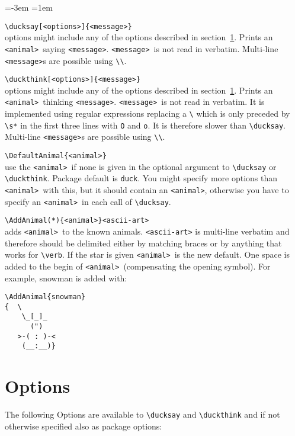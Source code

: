 \documentclass[]{article}
\newcommand*{\anml}{\texttt{<animal>}}
\newcommand*{\msg}{\texttt{<message>}}
\newenvironment{codedescription}{%
  \parindent=-3em%
  \parskip=1em%
  \par%
}{}
\begin{document}
\begin{codedescription}
\verb|\ducksay[<options>]{<message>}|\\
  options might include any of the options described in
  section~\ref{sec:options}. Prints an \anml\ saying \msg. \msg\ is not read in
  verbatim. Multi-line \msg s are possible using \verb|\\|.

\verb|\duckthink[<options>]{<message>}|\\
  options might include any of the options described in
  section~\ref{sec:options}. Prints an \anml\ thinking \msg. \msg\ is not read
  in verbatim. It is implemented using regular expressions replacing a \verb|\|
  which is only preceded by \verb|\s*| in the first three lines with \verb|O|
  and \verb|o|. It is therefore slower than \verb|\ducksay|. Multi-line \msg s
  are possible using \verb|\\|.

\verb|\DefaultAnimal{<animal>}|\\
  use the \anml\ if none is given in the optional argument to \verb|\ducksay| or
  \verb|\duckthink|. Package default is \texttt{duck}. You might specify more
  options than \anml\ with this, but it should contain an \anml, otherwise you
  have to specify an \anml\ in each call of \verb|\ducksay|.

\verb|\AddAnimal(*){<animal>}<ascii-art>|\\
  adds \anml\ to the known animals. \texttt{<ascii-art>} is multi-line verbatim
  and therefore should be delimited either by matching braces or by anything
  that works for \verb|\verb|. If the star is given \anml\ is the new default.
  One space is added to the begin of \anml\ (compensating the opening symbol).
  For example, snowman is added with:\\[1ex]
  \begin{minipage}{\linewidth}
\begin{verbatim}
\AddAnimal{snowman}
{  \
    \_[_]_
      (")
   >-( : )-<
    (__:__)}
\end{verbatim}
  \end{minipage}
\end{codedescription}
\section{Options}\label{sec:options}%
{\reversemarginpar{}}
The following Options are available to \verb|\ducksay| and \verb|\duckthink| and
if not otherwise specified also as package options:
\end{document}
